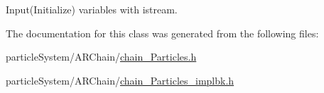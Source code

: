 Input(\+Initialize) variables with istream. 



The documentation for this class was generated from the following files\+:\begin{DoxyCompactItemize}
\item 
particle\+System/\+A\+R\+Chain/\mbox{\hyperlink{chain_particles_8h}{chain_\+Particles.\+h}}\item
particle\+System/\+A\+R\+Chain/\mbox{\hyperlink{chain_particles__implbk_8h}{chain_\+Particles\+\_\+implbk.\+h}}\end{DoxyCompactItemize}
